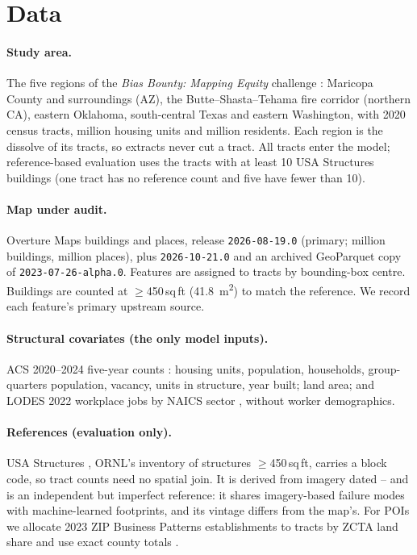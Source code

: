 \documentclass[11pt]{article}
\begin{document}
\section{Data}

\paragraph{Study area.} The five regions of the \emph{Bias Bounty: Mapping Equity} challenge \citep{biasbounty}: Maricopa County and surroundings (AZ), the Butte--Shasta--Tehama fire corridor (northern CA), eastern Oklahoma, south-central Texas and eastern Washington, with \NTracts{} 2020 census tracts, \NHU{} million housing units and \NPop{} million residents. Each region is the dissolve of its tracts, so extracts never cut a tract. All \NTracts{} tracts enter the model; reference-based evaluation uses the \RvN{} tracts with at least 10 USA Structures buildings (one tract has no reference count and five have fewer than 10).

\paragraph{Map under audit.} Overture Maps buildings and places, release \texttt{2026-08-19.0} (primary; \NBldg{} million buildings, \NPoi{} million places), plus \texttt{2026-10-21.0} and an archived GeoParquet copy of \texttt{2023-07-26-alpha.0}. Features are assigned to tracts by bounding-box centre. Buildings are counted at $\geq$450\,sq\,ft (\SI{41.8}{m^2}) to match the reference. We record each feature's primary upstream source.

\paragraph{Structural covariates (the only model inputs).} ACS 2020--2024 five-year counts \citep{acs}: housing units, population, households, group-quarters population, vacancy, units in structure, year built; land area; and LODES 2022 workplace jobs by NAICS sector \citep{lodes}, without worker demographics.

\paragraph{References (evaluation only).} USA Structures \citep{usastructures}, ORNL's inventory of structures $\geq$450\,sq\,ft, carries a block code, so tract counts need no spatial join. It is derived from imagery dated \MgImgFirst{}--\MgImgLast{} and is an independent but imperfect reference: it shares imagery-based failure modes with machine-learned footprints, and its vintage differs from the map's. For POIs we allocate 2023 ZIP Business Patterns establishments to tracts by ZCTA land share and use exact county totals \citep{cbp}.
\end{document}
